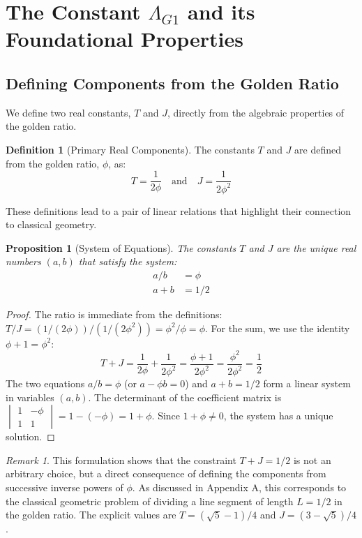 \documentclass{amsart}
\theoremstyle{plain}
\newtheorem{proposition}[theorem]{Proposition}
\theoremstyle{definition}
\newtheorem{definition}[theorem]{Definition}
\theoremstyle{remark}
\newtheorem*{remark}{Remark}
\newcommand{\LambdaG}{\Lambda_{G1}}
\newcommand{\phiG}{\phi}
\begin{document}
\section{The Constant \texorpdfstring{$\LambdaG$}{Lambda\_G1} and its Foundational Properties}

\subsection{Defining Components from the Golden Ratio}
We define two real constants, $T$ and $J$, directly from the algebraic properties of the golden ratio.
\begin{definition}[Primary Real Components]
The constants $T$ and $J$ are defined from the golden ratio, $\phiG$, as:
\[ T = \frac{1}{2\phiG} \quad \text{and} \quad J = \frac{1}{2\phiG^2} \]
\end{definition}

These definitions lead to a pair of linear relations that highlight their connection to classical geometry.
\begin{proposition}[System of Equations]
The constants $T$ and $J$ are the unique real numbers $(a,b)$ that satisfy the system:
\begin{align}
    a/b &= \phiG \label{eq:1} \\
    a+b &= 1/2 \label{eq:2}
\end{align}
\end{proposition}
\begin{proof}
The ratio is immediate from the definitions: $T/J = (1/(2\phiG))/(1/(2\phiG^2)) = \phiG^2/\phiG = \phiG$. For the sum, we use the identity $\phiG+1 = \phiG^2$:
\[ T+J = \frac{1}{2\phiG} + \frac{1}{2\phiG^2} = \frac{\phiG+1}{2\phiG^2} = \frac{\phiG^2}{2\phiG^2} = \frac{1}{2} \]
The two equations $a/b = \phiG$ (or $a - \phiG b = 0$) and $a+b=1/2$ form a linear system in variables $(a,b)$. The determinant of the coefficient matrix is $\begin{vmatrix} 1 & -\phiG \\ 1 & 1 \end{vmatrix} = 1 - (-\phiG) = 1+\phiG$. Since $1+\phiG \neq 0$, the system has a unique solution.
\end{proof}

\begin{remark}
This formulation shows that the constraint $T+J=1/2$ is not an arbitrary choice, but a direct consequence of defining the components from successive inverse powers of $\phiG$. As discussed in Appendix A, this corresponds to the classical geometric problem of dividing a line segment of length $L=1/2$ in the golden ratio. The explicit values are $T = (\sqrt{5}-1)/4$ and $J = (3-\sqrt{5})/4$.
\end{remark}
\end{document}
